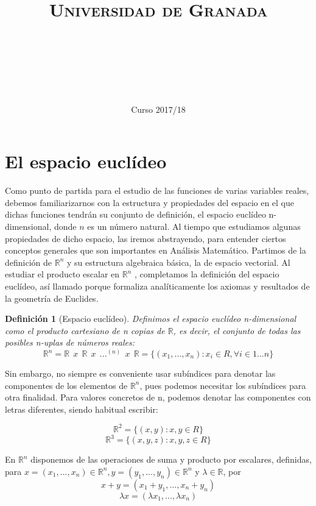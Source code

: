 \documentclass[11pt, a4paper]{article}
\title{
  \normalfont \normalsize 
  \textsc{Universidad de Granada} \\ [25pt]    %
  \horrule{0.5pt} \\[0.4cm] %
  \huge \sffamily\subject\\ %
  \horrule{2pt} \\[0.5cm] %
}
\author{\Large\sffamily{\docauthor}}
\date{\vspace{-1.5em} \normalsize \sffamily Curso 2017/18}
\newif\IfInSansMode
\newcommand{\R}{\mathbb{R}} \newcommand{\N}{\mathbb{N}}
\theoremstyle{theorem-style}
\theoremstyle{definition-style}
\newtheorem{ndef}{Definición}[section]
\theoremstyle{remark-style}
\theoremstyle{example-style}
\begin{document}
\maketitle  %
\vfill
\begin{center}
\end{center}
\newpage
\tableofcontents    %
\newpage



\section{El espacio euclídeo}
Como punto de partida para el estudio de las funciones de varias variables reales, debemos
familiarizarnos con la estructura y propiedades del espacio en el que dichas funciones tendrán
su conjunto de definición, el espacio euclídeo n-dimensional, donde $n$ es un número natural.
Al tiempo que estudiamos algunas propiedades de dicho espacio, las iremos abstrayendo, para
entender ciertos conceptos generales que son importantes en Análisis Matemático.
Partimos de la definición de $\R^n$ y su estructura algebraica básica, la de espacio vectorial.
Al estudiar el producto escalar en $\R^n$ , completamos la definición del espacio euclídeo, así
llamado porque formaliza analíticamente los axiomas y resultados de la geometría de Euclides.

\begin{ndef}[Espacio euclídeo]
	Definimos el espacio euclídeo n-dimensional como el producto cartesiano de n copias de $\R$, es decir, el conjunto de
	todas las posibles n-uplas de números reales: $$\R^n = \R  \ \ x \ \ \R \ \ x \ \ {...}^{(n)} \ \ x \ \ \R = \{(x_1,...,x_n): x_i \in R, \forall i \in {1...n}\}$$
\end{ndef}

Sin embargo, no siempre es conveniente usar subíndices para denotar las componentes de los
elementos de $\R^n$, pues podemos necesitar los subíndices para otra finalidad. Para valores concretos de n, podemos denotar las componentes con
letras diferentes, siendo habitual escribir:

$$\R^2 = \{(x,y): x,y \in R\}$$
$$\R^3 = \{(x,y,z): x,y,z \in R\}$$

En $\R^n$ disponemos de las operaciones de suma y producto por escalares, definidas, para $x = (x_1,...,x_n) \in \R^n, y = (y_1,...,y_n) \in \R^n$ y $\lambda \in \R$, por $$x + y = (x_1+y_1,...,x_n+y_n)$$ $$\lambda x = (\lambda x_1,...,\lambda x_n)$$
\end{document}
